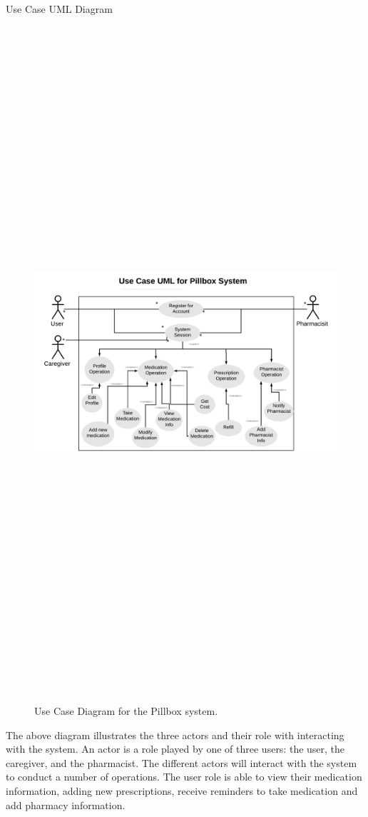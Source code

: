 \documentclass[22pt]{beamer}
\begin{document}
\begin{frame}[fragile]
\begin{textblock}{7.25}
\begin{block}{Use Case UML Diagram}
\begin{figure}
\begin{center}
\includegraphics[height=25cm, width=40cm]{UseCaseUML.png}
\end{center}
\caption{Use Case Diagram for the Pillbox system. }
\end{figure}
The above diagram illustrates the three actors and their role with interacting with the system. An actor is a role played by one of three users: the user, the caregiver, and the pharmacist. The different actors will interact with the system to conduct a number of operations. The user role is able to view their medication information, adding new prescriptions, receive reminders to take medication and add pharmacy information.


\end{block}
\end{textblock}
\end{frame}
\end{document}

